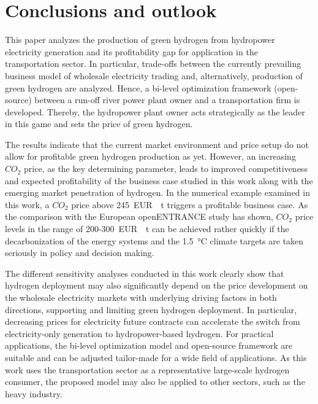 \documentclass[review]{elsarticle}
\begin{document}
\section{Conclusions and outlook}\label{conclusion}
This paper analyzes the production of green hydrogen from hydropower electricity generation and its profitability gap for application in the transportation sector. In particular, trade-offs between the currently prevailing business model of wholesale electricity trading and, alternatively, production of green hydrogen are analyzed. Hence, a bi-level optimization framework (open-source) between a run-off river power plant owner and a transportation firm is developed. Thereby, the hydropower plant owner acts strategically as the leader in this game and sets the price of green hydrogen.\vspace{0.3cm}

The results indicate that the current market environment and price setup do not allow for profitable green hydrogen production as yet. However, an increasing $CO_2$ price, as the key determining parameter, leads to improved competitiveness and expected profitability of the business case studied in this work along with the emerging market penetration of hydrogen. In the numerical example examined in this work, a $CO_2$ price above \SI{245}{EUR \per t} triggers a profitable business case. As the comparison with the European {openENTRANCE} study has shown, $CO_2$ price levels in the range of \SI{200}{}-\SI{300}{EUR \per \tonne} can be achieved rather quickly if the decarbonization of the energy systems and the \SI{1.5}{\degreeCelsius} climate targets are taken seriously in policy and decision making.\vspace{0.3cm} 

The different sensitivity analyses conducted in this work clearly show that hydrogen deployment may also significantly depend on the price development on the wholesale electricity markets with underlying driving factors in both directions, supporting and limiting green hydrogen deployment. In particular, decreasing prices for electricity future contracts can accelerate the switch from electricity-only generation to hydropower-based hydrogen. For practical applications, the bi-level optimization model and open-source framework are suitable and can be adjusted tailor-made for a wide field of applications. As this work uses the transportation sector as a representative large-scale hydrogen consumer, the proposed model may also be applied to other sectors, such as the heavy industry.\vspace{0.3cm}
\end{document}
